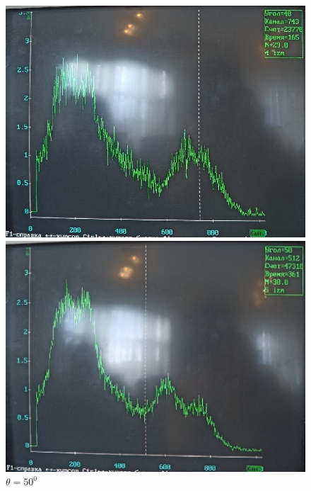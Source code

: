 \documentclass[a4paper, 12pt]{article}%
\begin{document}
\begin{figure}[h]
\begin{minipage}[h]{0.3\linewidth}
\includegraphics[width = 1\linewidth]{7.jpg}
\caption{$\theta = 40^0$}
\end{minipage}
\hfill
\begin{minipage}[h]{0.3\linewidth}
\includegraphics[width = 1\linewidth]{8.jpg}
\caption{$\theta = 50^0$}
\end{minipage}
\hfill
\begin{minipage}[h]{0.3\linewidth}

\end{minipage}
\end{figure}
\end{document}
